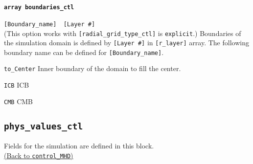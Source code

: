 \paragraph{\tt array boundaries\_ctl}
\verb|[Boundary_name]  [Layer #]| \\
\label{href_t:boundaries_ctl} 
(This option works with \verb|[radial_grid_type_ctl]| is {\tt explicit}.)
Boundaries of the simulation domain is defined by \verb|[Layer #]| in \verb|[r_layer]| array. The following boundary name can be defined for \verb|[Boundary_name]|.
%
\begin{description}
	\item{\tt to\_Center} Inner boundary of the domain to fill the center.
	\item{\tt ICB} ICB
	\item{\tt CMB} CMB
\end{description}
%
%
%

\subsection{\tt phys\_values\_ctl}
\label{href_t:phys_values_ctl}
Fields for the simulation are defined in this block. \\
\hyperref[href_i:phys_values_ctl]{(Back to {\tt control\_MHD})}
%

